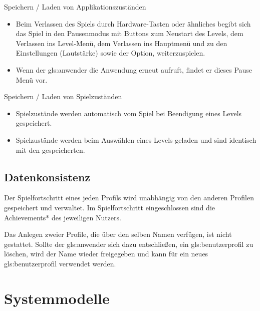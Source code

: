 \documentclass{scrartcl}
\begin{document}
\begin{telist}
	\item Speichern / Laden von Applikationszuständen
	\begin{itemize}
		\item Beim Verlassen des Spiels durch Hardware-Tasten oder ähnliches begibt sich das Spiel in den Pausenmodus mit Buttons zum Neustart des Levels, dem Verlassen ins Level-Menü, dem Verlassen ins Hauptmenü und zu den Einstellungen (Lautstärke) sowie der Option, weiterzuspielen.
		\item Wenn der \gls{gls:anwender} die Anwendung erneut aufruft, findet er dieses Pause Menü vor.
	\end{itemize}
	
	\item Speichern / Laden von Spielzuständen
	\begin{itemize}
		\item Spielzustände werden automatisch vom Spiel bei Beendigung eines Levels gespeichert.
		\item Spielzustände werden beim Auswählen eines Levels geladen und sind identisch mit den gespeicherten.
	\end{itemize}
\end{telist}

\subsection{Datenkonsistenz}

\begin{telist}[resume]
	\item Der Spielfortschritt eines jeden Profils wird unabhängig von den anderen Profilen gespeichert und verwaltet. Im Spielfortschritt eingeschlossen sind die Achievements* des jeweiligen Nutzers.
	\item Das Anlegen zweier Profile, die über den selben Namen verfügen, ist nicht gestattet. Sollte der \gls{gls:anwender} sich dazu entschließen, ein \gls{gls:benutzerprofil} zu löschen, wird der Name wieder freigegeben und kann für ein neues \gls{gls:benutzerprofil} verwendet werden.
\end{telist}

\clearpage











\section{Systemmodelle}
\end{document}
